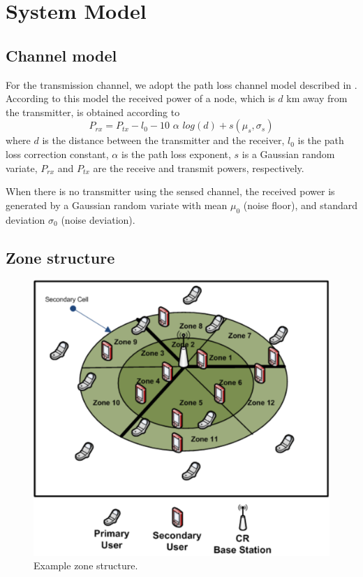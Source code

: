 \documentclass[conference,compsoc]{IEEEtran}
\newcommand{\beqn}{\begin{equation}}
\newcommand{\eeqn}{\end{equation}}
\begin{document}
\section{\label{sec:system_model}System Model}
\subsection{Channel model}
For the transmission channel, we adopt the path loss channel model described in \cite{faramir}. According to this model the received power of a node, which is $d$ km away from the transmitter, is obtained according to\\
\beqn
    P_{rx} = P_{tx} - l_0 - 10\,\, \alpha \,\, log(d) + s(\mu_s, \sigma_s)
\eeqn
where $d$ is the distance between the transmitter and the receiver, $l_0$ is the path loss correction constant, $\alpha$ is the path loss exponent, $s$ is a Gaussian random variate,  $P_{rx}$ and $P_{tx}$ are the receive and transmit powers, respectively.

When there is no transmitter using the sensed channel, the received power is generated by a Gaussian random variate with mean $\mu_0$ (noise floor), and standard deviation $\sigma_0$ (noise deviation).

\subsection{Zone structure}

\begin{figure}[!htb]
\centering
\includegraphics[width=0.99\columnwidth,keepaspectratio] {figs/cellStructure.eps}
\caption{Example zone structure.} \label{fig:zone_structure}
\end{figure}
\end{document}
